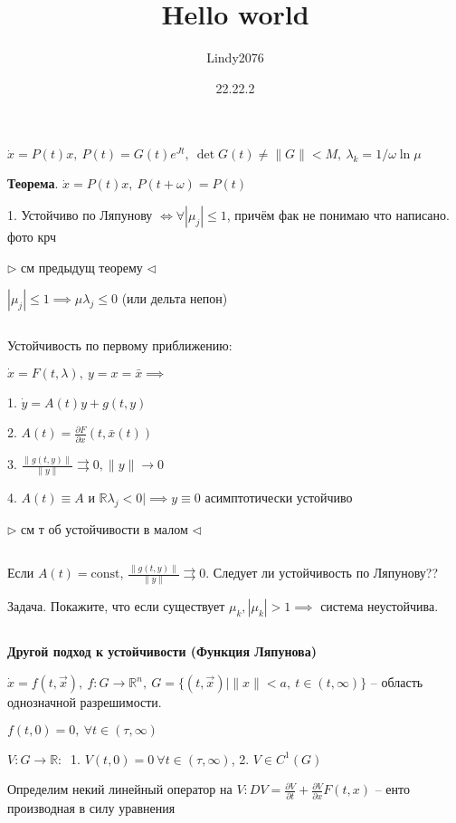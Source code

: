 \documentclass[12pt, a4paper]{article}
\title{Hello world}
\author{Lindy2076}
\date{22.22.2} %
\begin{document}
    $\dot{x} = P(t)x, \ P(t) = G(t) e^{Jt}, \ \det G(t) \neq \| G \| < M, \ \lambda_k = 1/\omega \ln \mu$

    \textbf{Теорема}. $\dot x = P(t)x, \ P(t + \omega) = P(t)$

    1. Устойчиво по Ляпунову $\iff \forall | \mu_j | \le 1$, причём фак не понимаю что написано. фото крч

    $\triangleright$ см предыдущ теорему $\triangleleft$

    $| \mu_j | \le 1 \implies \mu \lambda_j \le 0$ (или дельта непон)

    \par $ $

    Устойчивость по первому приближению: 

    $\dot x = F(t, \lambda), \ y = x = \bar x \implies$ 
    
    1. $\dot y  = A(t) y + g(t,y)$

    2. $A(t) = \frac{\partial F}{\partial x }(t, \bar x (t))$

    3. $\frac{\| g(t,y)\|}{\|y\|} \rightrightarrows 0, \|y\| \to 0$

    4. $A(t) \equiv A$ и $\mathbb{R}\lambda_j < 0 |\implies y\equiv 0$ асимптотически устойчиво

    $\triangleright$ см т об устойчивости в малом $\triangleleft$

    \par $ $ 

    Если $A(t) = \text{const}$, $\frac{\|g(t,y)\|}{\|y\|}\rightrightarrows 0$. Следует ли устойчивость по Ляпунову??

    Задача. Покажите, что если существует $\mu_k, |\mu_k| > 1 \implies$ система неустойчива.

    \par $ $

    \textbf{Другой подход к устойчивости (Функция Ляпунова)}

    $\dot x = f(t, \vec x), \ f: G \to \mathbb{R}^n, \ G = \{ (t, \vec x) \mid \| x \| < a, \ t \in (t, \infty) \} $ -- область однозначной разрешимости.

    $f(t, 0) = 0, \ \forall t \in (\tau, \infty)$

    $V: G \to \mathbb{R}: \ $ 1. $V(t,0) = 0 \ \forall t \in (\tau, \infty)$, 2. $V \in C^1(G)$

    Определим некий линейный оператор на $V: DV = \frac{\partial V}{\partial t} + \frac{\partial V}{\partial x} F(t,x)$ -- енто производная в силу уравнения
\end{document}
